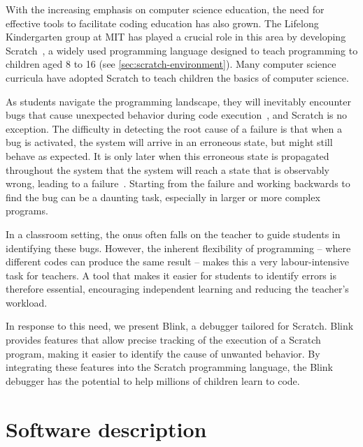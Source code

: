 \documentclass[../main]{subfiles}
\begin{document}
With the increasing emphasis on computer science education, the need for effective tools to facilitate coding education has also grown.
The Lifelong Kindergarten group at MIT has played a crucial role in this area by developing Scratch~\autocite{resnickScratchProgrammingAll2009}, a widely used programming language designed to teach programming to children aged 8 to 16 (see \cref{sec:scratch-environment}).
Many computer science curricula have adopted Scratch to teach children the basics of computer science.

As students navigate the programming landscape, they will inevitably encounter bugs that cause unexpected behavior during code execution~\autocite{zellerWhyProgramsFail2009a}, and Scratch is no exception.
The difficulty in detecting the root cause of a failure is that when a bug is activated, the system will arrive in an erroneous state, but might still behave as expected.
It is only later when this erroneous state is propagated throughout the system that the system will reach a state that is observably wrong, leading to a failure~\autocite{ammannIntroductionSoftwareTesting2016}.
Starting from the failure and working backwards to find the bug can be a daunting task, especially in larger or more complex programs.

In a classroom setting, the onus often falls on the teacher to guide students in identifying these bugs.
However, the inherent flexibility of programming -- where different codes can produce the same result -- makes this a very labour-intensive task for teachers.
A tool that makes it easier for students to identify errors is therefore essential, encouraging independent learning and reducing the teacher's workload.

In response to this need, we present Blink, a debugger tailored for Scratch.
Blink provides features that allow precise tracking of the execution of a Scratch program, making it easier to identify the cause of unwanted behavior.
By integrating these features into the Scratch programming language, the Blink debugger has the potential to help millions of children learn to code.

\section{Software description}\label{sec:blink-software-description}
\end{document}
